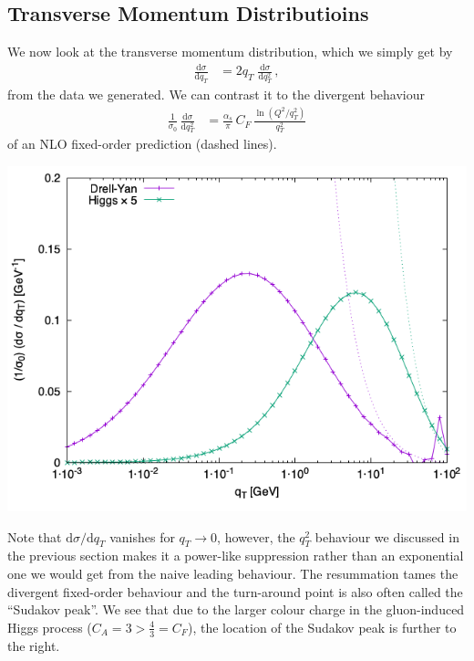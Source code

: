 \documentclass[11pt]{article}
\begin{document}
\subsection{Transverse Momentum Distributioins}
\label{sec:orge70ecd7}
We now look at the transverse momentum distribution, which we simply get by
\begin{align}
  \frac{\mathrm{d}\sigma}{\mathrm{d}q_T}
  &=
  2 q_T \; \frac{\mathrm{d}\sigma}{\mathrm{d}q_T^2}
  \,,
\end{align}
from the data we generated.
We can contrast it to the divergent behaviour
\begin{align}
  \frac{1}{\sigma_0}\,\frac{\mathrm{d}\sigma}{\mathrm{d}q_T^2}
  &=
  \frac{\alpha_s}{\pi}\, C_F \, \frac{\ln(Q^2 / q_T^2)}{q_T^2}
\end{align}
of an NLO fixed-order prediction (dashed lines).
\begin{center}
\includegraphics[width=.9\linewidth]{plot_dy.png}
\label{}
\end{center}
Note that \(\mathrm{d}\sigma/\mathrm{d}q_T\) vanishes for \(q_T\to0\), however, the \(q_T^2\) behaviour we discussed in the previous section makes it a power-like suppression rather than an exponential one we would get from the naive leading behaviour.
The resummation tames the divergent fixed-order behaviour and the turn-around point is also often called the ``Sudakov peak''.
We see that due to the larger colour charge in the gluon-induced Higgs process (\(C_A = 3 > \tfrac{4}{3} = C_F\)), the location of the Sudakov peak is further to the right.
\end{document}
